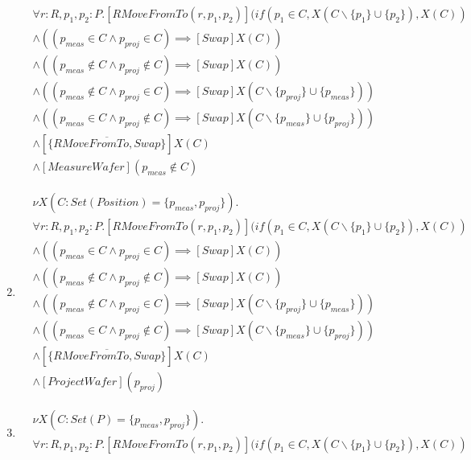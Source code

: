 \begin{enumerate}
\begin{align*}
            & \forall r:R, p_1, p_2 : P . [RMoveFromTo(r, p_1, p_2)](if(p_1 \in C, X(C\backslash\{p_1\}\cup\{p_2\}), X(C))\\
            &\wedge ((p_\mathit{meas} \in C \wedge p_\mathit{proj} \in C) \implies [Swap]X(C))\\
            &\wedge ((p_\mathit{meas} \notin C \wedge p_\mathit{proj} \notin C) \implies [Swap]X(C))\\
            &\wedge ((p_\mathit{meas} \notin C \wedge p_\mathit{proj} \in C) \implies [Swap]X(C\backslash\{p_\mathit{proj}\} \cup \{p_\mathit{meas}\}))\\
            &\wedge ((p_\mathit{meas} \in C \wedge p_\mathit{proj} \notin C) \implies [Swap]X(C\backslash\{p_\mathit{meas}\} \cup \{p_\mathit{proj}\}))\\
            &\wedge [\overline{\{RMoveFromTo, Swap\}}]X(C)\\
            &\wedge [MeasureWafer](p_\mathit{meas} \notin C)
        \end{align*}
    \item \begin{align*}
    		&\nu X(C : \mathit{Set}(\mathit{Position}) = \{p_\mathit{meas},p_\mathit{proj}\}).\\
            & \forall r:R, p_1, p_2 : P . [RMoveFromTo(r, p_1, p_2)](if(p_1 \in C, X(C\backslash\{p_1\}\cup\{p_2\}), X(C))\\
            &\wedge ((p_\mathit{meas} \in C \wedge p_\mathit{proj} \in C) \implies [\mathit{Swap}]X(C))\\
            &\wedge ((p_\mathit{meas} \notin C \wedge p_\mathit{proj} \notin C) \implies [\mathit{Swap}]X(C))\\
            &\wedge ((p_\mathit{meas} \notin C \wedge p_\mathit{proj} \in C) \implies [\mathit{Swap}]X(C\backslash\{p_\mathit{proj}\} \cup \{p_\mathit{meas}\}))\\
            &\wedge ((p_\mathit{meas} \in C \wedge p_\mathit{proj} \notin C) \implies [\mathit{Swap}]X(C\backslash\{p_\mathit{meas}\} \cup \{p_\mathit{proj}\}))\\
            &\wedge [\overline{\{RMoveFromTo, Swap\}}]X(C)\\
            &\wedge [ProjectWafer](p_\mathit{proj})
        \end{align*}
    \item \begin{align*}
    		&\nu X(C : Set(P) = \{p_\mathit{meas},p_\mathit{proj}\}).\\
            & \forall r:R, p_1, p_2 : P . [RMoveFromTo(r, p_1, p_2)](if(p_1 \in C, X(C\backslash\{p_1\}\cup\{p_2\}), X(C))\\

\end{align*}
\end{enumerate}
